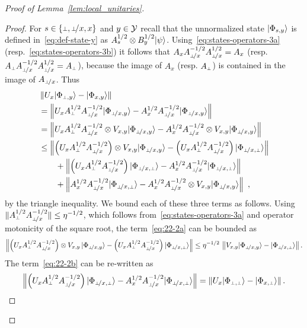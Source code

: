 \begin{proof}[Proof of Lemma~\ref{lem:local_unitaries}]
\begin{proof}
For $s \in \{\dummy, \dummyx, x\}$ and $y \in \mathcal{Y}$ recall that the unnormalized state ${|\Phi_{s,y}\rangle}$ is defined in~\eqref{eq:def-state-y} as $A_s^{1/2} \otimes B_y^{1/2} {|\psi\rangle}$. Using~\eqref{eq:states-operators-3a} (resp.~\eqref{eq:states-operators-3b}) it follows that $A_x A_{\dummyx}^{-1/2} A_\dummyx^{1/2} = A_x$ (resp. $A_\dummy A_{\dummyx}^{-1/2} A_\dummyx^{1/2} = A_\dummy$), because the image of $A_x$ (resp. $A_\dummy$) is contained in the image of $A_\dummyx$. Thus
\begin{align}
	&\left \| U_x \ket{\Phi_{\dummy,y}} - \ket{\Phi_{x,y}} \right \| \notag \\
	&= \left \| U_x A_\dummy^{1/2} A_\dummyx^{-1/2} \ket{\Phi_{\dummyx,y}} - A_{x}^{1/2} A_{\dummy\! /x}^{-1/2}  \ket{\Phi_{\dummyx,y}} \right \| \notag \\
	&= \left \| U_x A_\dummy^{1/2} A_\dummyx^{-1/2} \otimes V_{x,y} \ket{\Phi_{\dummyx,y}} - A_{x}^{1/2} A_{\dummy\! /x}^{-1/2} \otimes V_{x,y}  \ket{\Phi_{\dummyx,y}} \right \| \notag \\
&\leq  \left \| \left ( U_x A_\dummy^{1/2} A_\dummyx^{-1/2} \right ) \otimes V_{x,y} \ket{\Phi_{\dummyx,y}} - \left ( U_x A_\dummy^{1/2} A_\dummyx^{-1/2} \right ) \ket{\Phi_{\dummyx, \dummy}} \right \|  \label{eq:22-2a}\\
& \qquad +  \left \| \left ( U_x A_\dummy^{1/2} A_\dummyx^{-1/2} \right ) \ket{\Phi_{\dummyx,\dummy}} - A_x^{1/2} A_\dummyx^{-1/2}  \ket{\Phi_{\dummyx,\dummy}} \right \| \label{eq:22-2b}\\
& \qquad + \left \| A_x^{1/2} A_\dummyx^{-1/2} \ket{\Phi_{\dummyx,\dummy}} - A_x^{1/2} A_\dummyx^{-1/2}  \otimes V_{x,y} \ket{\Phi_{\dummyx,y}} \right \|~,\label{eq:22-2c}
\end{align}
by the triangle inequality. We bound each of these three terms as follows. 
Using $\|A_\dummy^{1/2} A_\dummyx^{-1/2}\|\leq \eta^{-1/2}$, which follows from~\eqref{eq:states-operators-3a} and operator motonicity of the square root, the term~\eqref{eq:22-2a} can be bounded as
$$
\left \| \left ( U_x A_\dummy^{1/2} A_\dummyx^{-1/2} \right ) \otimes V_{x,y}\, \ket{\Phi_{\dummyx,y}} - \left ( U_x A_\dummy^{1/2} A_\dummyx^{-1/2} \right ) \ket{\Phi_{\dummyx,\dummy}} \right \|  \leq \eta^{-1/2} \, \left \|  V_{x,y} \ket{\Phi_{\dummyx,y}} - \ket{\Phi_{\dummyx,\dummy}} \right \|.
$$
The term~\eqref{eq:22-2b} can be re-written as
$$
\left \| \left ( U_x A_\dummy^{1/2} A_\dummyx^{-1/2} \right ) \ket{\Phi_{\dummyx,\dummy}} - A_x^{1/2} A_\dummyx^{-1/2}  \ket{\Phi_{\dummyx,\dummy}} \right \| = \left \| U_x \ket{\Phi_{\dummy,\dummy}} - \ket{\Phi_{x,\dummy}} \right \|.
$$
\end{proof}
\end{proof}
